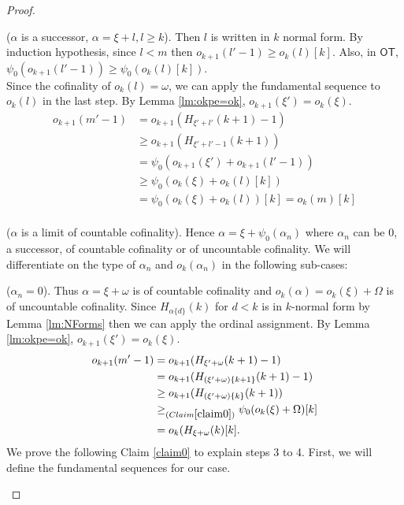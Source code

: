 \documentclass{amsart}
\theoremstyle{plain}
\theoremstyle{plain}
\newcommand\OT{\mathsf{OT}}
\newcommand{\Om}{{\Omega}}
\newcommand{\okpe}{o_{k+1}}
\newcommand{\ok}{o_{k}}
\newcommand{\al}{{\alpha}}
\newcommand{\om}{\omega}
\begin{document}
\begin{proof}
\begin{Cases}
\begin{Cases}
        \item ($\al$ is a successor, $\al=\xi+l, l\geq k$). Then $l$ is written in $k$ normal form. By induction hypothesis, since $l<m$ then $\okpe(l'-1)\geq \ok(l)[k]$. Also, in $\OT$, $\psi_0(\okpe(l'-1)) \geq \psi_0(\ok(l)[k])$.\\
        Since the cofinality of $\ok(l) =\om$, we can apply the fundamental sequence to $\ok(l)$ in the last step. 
        By Lemma \ref{lm:okpe=ok}, $\okpe(\xi')=\ok(\xi)$.
        \begin{align*} 
            \okpe(m'-1)& =\okpe(H_{\xi'+l'} (k+1) -1)\\
            & \geq \okpe(H_{\xi'+l'-1}  (k+1) )\\
            & = \psi_0({\okpe(\xi')} + \okpe(l'-1)) \\
            &\geq \psi_0({\ok(\xi)}+ \ok(l)[k])\\
            &=\psi_0({\ok(\xi)}+ \ok(l))[k]=\ok(m)[k]\\
        \end{align*}
        
        
        \item ($\al$ is a limit of countable cofinality). Hence $\al = \xi + \psi_0(\al_n)$ where $\al_n$ can be $0$, a successor, of countable cofinality or of uncountable cofinality. We will differentiate on the type of $\al_n$ and $\ok(\al_n)$ in the following sub-cases:\medskip
        
        \begin{Cases}
            \item ($\al_n = 0$). Thus $\al = \xi + \om$ is of countable cofinality and $\ok(\al)=\ok(\xi)+\Om$ is of uncountable cofinality.
            Since $H_{\al\{d\}}(k)$ for $d<k$ is in $k$-normal form by Lemma \ref{lm:NForms} then we can apply the ordinal assignment.
            By Lemma \ref{lm:okpe=ok}, $\okpe(\xi')=\ok(\xi)$.
            \begin{align*} 
                \okpe(m'-1) & =\okpe(H_{\xi'+\om}(k+1) -1)\\
                & = \okpe(H_{(\xi'+\om)\{k+1\}}(k+1) -1)\\
                & \geq  \okpe(H_{(\xi'+\om)\{k\}}(k+1))\\
                & \geq_{(Claim \ref{claim0})} \psi_0( \ok(\xi)+ \Om )[k]\\
                &=\ok(H_{\xi+\om}(k)[k].\\
            \end{align*}
            We prove the following Claim \ref{claim0} to explain steps 3 to 4.
            First, we will define the fundamental sequences for our case.\\
            

\end{Cases}
\end{Cases}
\end{Cases}
\end{proof}
\end{document}

